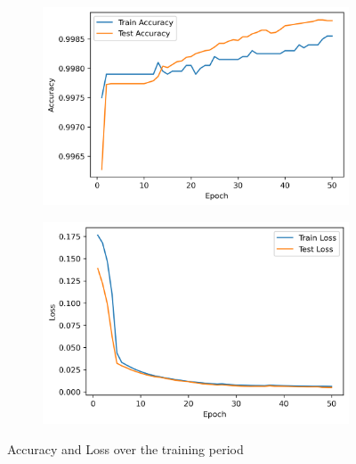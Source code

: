 \documentclass[utf8x]{ctexart}
\begin{document}
\begin{figure}[htb]
  \centering
  \begin{subfigure}[b]{0.48\textwidth}
    \centering
    \includegraphics[width=\textwidth]{./images/net(d4_k8)_E50_LR0.0001_B64/accuracy.png}
    \label{fig:accuracy}
  \end{subfigure}
  \begin{subfigure}[b]{0.48\textwidth}
    \centering
    \includegraphics[width=\textwidth]{./images/net(d4_k8)_E50_LR0.0001_B64/loss.png}
    \label{fig:loss}
  \end{subfigure}
  \caption{Accuracy and Loss over the training period}
  \label{fig:accuracy_and_loss}
\end{figure}
\end{document}
